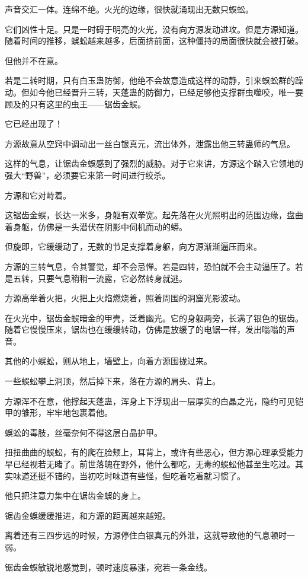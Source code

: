 \begin{this_body}
声音交汇一体。连绵不绝。火光的边缘，很快就涌现出无数只蜈蚣。

它们凶性十足。只是一时碍于明亮的火光，没有向方源发动进攻。但是方源知道。随着时间的推移，蜈蚣越来越多，后面挤前面，这种僵持的局面很快就会被打破。

但他并不在意。

若是二转时期，只有白玉蛊防御，他绝不会故意造成这样的动静，引来蜈蚣群的躁动。但如今他已经晋升三转，天蓬蛊的防御力，已经足够他支撑群虫噬咬，唯一要顾及的只有这里的虫王——锯齿金蜈。

它已经出现了！

方源故意从空窍中调动出一丝白银真元，流出体外，泄露出他三转蛊师的气息。

这样的气息，让锯齿金蜈感到了强烈的威胁。对于它来讲，方源这个踏入它领地的强大“野兽”，必须要它来第一时间进行绞杀。

方源和它对峙着。

这锯齿金蜈，长达一米多，身躯有双拳宽。起先落在火光照明出的范围边缘，盘曲着身躯，仿佛是一头潜伏在阴影中伺机而动的蟒。

但旋即，它缓缓动了，无数的节足支撑着身躯，向方源渐渐逼压而来。

方源的三转气息，令其警觉，却不会忌惮。若是四转，恐怕就不会主动逼压了。若是五转，只要气息稍稍一流露，它必然转身就逃。

方源高举着火把，火把上火焰燃烧着，照着周围的洞窟光影波动。

在火光中，锯齿金蜈暗金的甲壳，泛着幽光。它的身躯两旁，长满了银色的锯齿。随着它慢慢压来，锯齿也在缓缓转动，仿佛是放缓了的电锯一样，发出嗡嗡的声音。

其他的小蜈蚣，则从地上，墙壁上，向着方源围拢过来。

一些蜈蚣攀上洞顶，然后掉下来，落在方源的肩头、背上。

方源浑不在意，他撑起天蓬蛊，浑身上下浮现出一层厚实的白晶之光，隐约可见铠甲的雏形，牢牢地包裹着他。

蜈蚣的毒肢，丝毫奈何不得这层白晶护甲。

扭扭曲曲的蜈蚣，有的爬在脸颊上，耳背上，或许有些恶心，但方源心理承受能力早已经视若无睹了。前世落魄在野外，他什么都吃，无毒的蜈蚣他甚至生吃过。其实味道还挺不错的，当初吃时味道有些怪，但吃着吃着就习惯了。

他只把注意力集中在锯齿金蜈的身上。

锯齿金蜈缓缓推进，和方源的距离越来越短。

离着还有三四步远的时候，方源停住白银真元的外泄，这就导致他的气息顿时一弱。

锯齿金蜈敏锐地感觉到，顿时速度暴涨，宛若一条金线。


\end{this_body}
